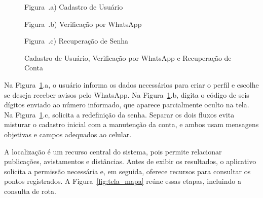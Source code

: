 \begin{figure}[H]
    \centering
    \caption{Cadastro de Usuário, Verificação por WhatsApp e Recuperação de Conta}
    \label{fig:tela_cadastro_recuperacao}
    \vspace{0.15cm}
    \begin{minipage}[t]{0.31\textwidth}
        \centering
        \par\vspace{0.15cm}
        {\small Figura~\thefigure.a) Cadastro de Usuário}
    \end{minipage}
    \hfill
    \begin{minipage}[t]{0.31\textwidth}
        \centering
        \par\vspace{0.15cm}
        {\small Figura~\thefigure.b) Verificação por WhatsApp}
    \end{minipage}
    \hfill
    \begin{minipage}[t]{0.31\textwidth}
        \centering
        \par\vspace{0.15cm}
        {\small Figura~\thefigure.c) Recuperação de Senha}
    \end{minipage}
    \par\vspace{0.12cm}
\end{figure}

Na Figura~\ref{fig:tela_cadastro_recuperacao}.a, o usuário informa os dados necessários para criar o perfil e escolhe se deseja receber avisos pelo WhatsApp. Na Figura~\ref{fig:tela_cadastro_recuperacao}.b, digita o código de seis dígitos enviado ao número informado, que aparece parcialmente oculto na tela. Na Figura~\ref{fig:tela_cadastro_recuperacao}.c, solicita a redefinição da senha. Separar os dois fluxos evita misturar o cadastro inicial com a manutenção da conta, e ambos usam mensagens objetivas e campos adequados ao celular.

A localização é um recurso central do sistema, pois permite relacionar publicações, avistamentos e distâncias. Antes de exibir os resultados, o aplicativo solicita a permissão necessária e, em seguida, oferece recursos para consultar os pontos registrados. A Figura~\ref{fig:tela_mapa} reúne essas etapas, incluindo a consulta de rota.

